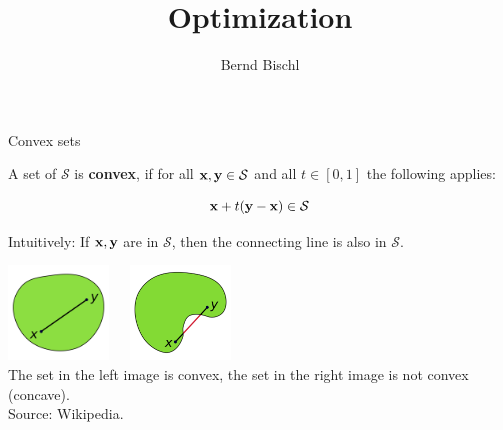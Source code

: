 





\newcommand{\titlefigure}{figure_man/hinge_vs_l2.pdf}
\newcommand{\learninggoals}{
\item Convex vs. Non-Convex
\item Convex set \& functions}



\title{Optimization}
\author{Bernd Bischl}
\date{}



\sloppy




\begin{vbframe}{Convex sets}

A set of $\mathcal{S}$ is \textbf{convex}, if for all $\mathbf{x}, \mathbf{y} \in \mathcal{S}$ and all $t \in [0, 1]$ the following applies:

$$
\mathbf{x} + t (\mathbf{y} - \mathbf{x}) \in \mathcal{S}
$$

Intuitively: If $\mathbf{x}, \mathbf{y}$ are in $\mathcal{S}$, then the connecting line is also in $\mathcal{S}$.

\begin{center}
\includegraphics[width = 0.2\textwidth]{figure_man/convex.png}~~~\includegraphics[width = 0.2\textwidth]{figure_man/concave.png} \\
\footnotesize{The set in the left image is convex, the set in the right image is not convex (concave). \\
Source: Wikipedia. 
}
\end{center}

\end{vbframe}

